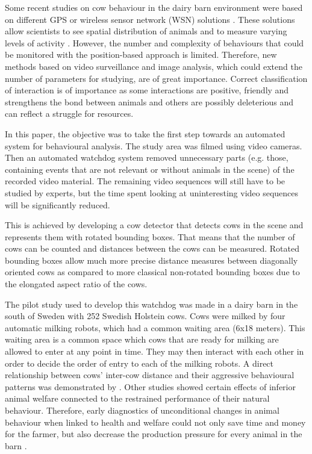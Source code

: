 \documentclass{cta-author}
\begin{document}
Some recent studies on cow behaviour in the dairy barn environment were based on different GPS or wireless sensor network (WSN) solutions \cite{Nadimietal2012}. These solutions allow scientists to see spatial distribution of animals and to measure varying levels of activity \cite{Nadimietal2012}. However, the number and complexity of behaviours that could be monitored with the position-based approach is limited. Therefore, new methods based on video surveillance and image analysis, which could extend the number of parameters for studying, are of great importance. Correct classification of interaction is of importance as some interactions are positive, friendly and strengthens the bond between animals and others are possibly deleterious and can reflect a struggle for resources.

In this paper, the objective was to take the first step towards an automated system for behavioural analysis. The study area was filmed using video cameras. Then an automated watchdog system removed unnecessary parts (e.g. those, containing events that are not relevant or without animals in the scene) of the recorded video material. The remaining video sequences will still have to be studied by experts, but the time spent looking at uninteresting video sequences will be significantly reduced. 

This is achieved by developing a cow detector that detects cows in the scene and represents them with rotated bounding boxes. That means that the number of cows can be counted and distances between the cows can be measured. Rotated bounding boxes allow much more precise distance measures between diagonally oriented cows as compared to more classical non-rotated bounding boxes due to the elongated aspect ratio of the cows.

The pilot study used to develop this watchdog was made in a dairy barn in the south of Sweden with 252 Swedish Holstein cows. Cows were milked by four automatic milking robots, which had a common waiting area (6x18 meters). This waiting area is a common space which cows that are ready for milking are allowed to enter at any point in time. They may then interact with each other in order to decide the order of entry to each of the milking robots. A direct relationship between cows' inter-cow distance and their aggressive behavioural patterns was demonstrated by \cite{DeVriesetal2004}. Other studies \cite{Hemsworth2003, Kilgour2012, guzhva2016feasibility} showed certain effects of inferior animal welfare connected to the restrained performance of their natural behaviour. Therefore, early diagnostics of unconditional changes in animal behaviour when linked to health and welfare could not only save time and money for the farmer, but also decrease the production pressure for every animal in the barn \cite{Polikarpusetal2015}.
\end{document}

